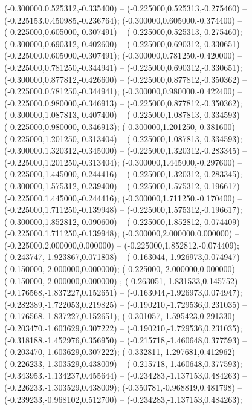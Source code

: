  (-0.300000,0.525312,-0.335400) -- (-0.225000,0.525313,-0.275460) -- (-0.225153,0.450985,-0.236764);
 (-0.300000,0.605000,-0.374400) -- (-0.225000,0.605000,-0.307491) -- (-0.225000,0.525313,-0.275460);
 (-0.300000,0.690312,-0.402600) -- (-0.225000,0.690312,-0.330651) -- (-0.225000,0.605000,-0.307491);
 (-0.300000,0.781250,-0.420000) -- (-0.225000,0.781250,-0.344941) -- (-0.225000,0.690312,-0.330651);
 (-0.300000,0.877812,-0.426600) -- (-0.225000,0.877812,-0.350362) -- (-0.225000,0.781250,-0.344941);
 (-0.300000,0.980000,-0.422400) -- (-0.225000,0.980000,-0.346913) -- (-0.225000,0.877812,-0.350362);
 (-0.300000,1.087813,-0.407400) -- (-0.225000,1.087813,-0.334593) -- (-0.225000,0.980000,-0.346913);
 (-0.300000,1.201250,-0.381600) -- (-0.225000,1.201250,-0.313404) -- (-0.225000,1.087813,-0.334593);
 (-0.300000,1.320312,-0.345000) -- (-0.225000,1.320312,-0.283345) -- (-0.225000,1.201250,-0.313404);
 (-0.300000,1.445000,-0.297600) -- (-0.225000,1.445000,-0.244416) -- (-0.225000,1.320312,-0.283345);
 (-0.300000,1.575312,-0.239400) -- (-0.225000,1.575312,-0.196617) -- (-0.225000,1.445000,-0.244416);
 (-0.300000,1.711250,-0.170400) -- (-0.225000,1.711250,-0.139948) -- (-0.225000,1.575312,-0.196617);
 (-0.300000,1.852812,-0.090600) -- (-0.225000,1.852812,-0.074409) -- (-0.225000,1.711250,-0.139948);
 (-0.300000,2.000000,0.000000) -- (-0.225000,2.000000,0.000000) -- (-0.225000,1.852812,-0.074409);
 (-0.243747,-1.923867,0.071808) -- (-0.163044,-1.926973,0.074947) -- (-0.150000,-2.000000,0.000000);
 (-0.225000,-2.000000,0.000000) -- (-0.150000,-2.000000,0.000000) ;
 (-0.263051,-1.831533,0.145752) -- (-0.176568,-1.837227,0.152651) -- (-0.163044,-1.926973,0.074947);
 (-0.282389,-1.722053,0.219825) -- (-0.190210,-1.729536,0.231035) -- (-0.176568,-1.837227,0.152651);
 (-0.301057,-1.595423,0.291330) -- (-0.203470,-1.603629,0.307222) -- (-0.190210,-1.729536,0.231035);
 (-0.318188,-1.452976,0.356950) -- (-0.215718,-1.460648,0.377593) -- (-0.203470,-1.603629,0.307222);
 (-0.332811,-1.297681,0.412962) -- (-0.226233,-1.303529,0.438009) -- (-0.215718,-1.460648,0.377593);
 (-0.343953,-1.134237,0.455644) -- (-0.234283,-1.137153,0.484263) -- (-0.226233,-1.303529,0.438009);
 (-0.350781,-0.968819,0.481798) -- (-0.239233,-0.968102,0.512700) -- (-0.234283,-1.137153,0.484263);
